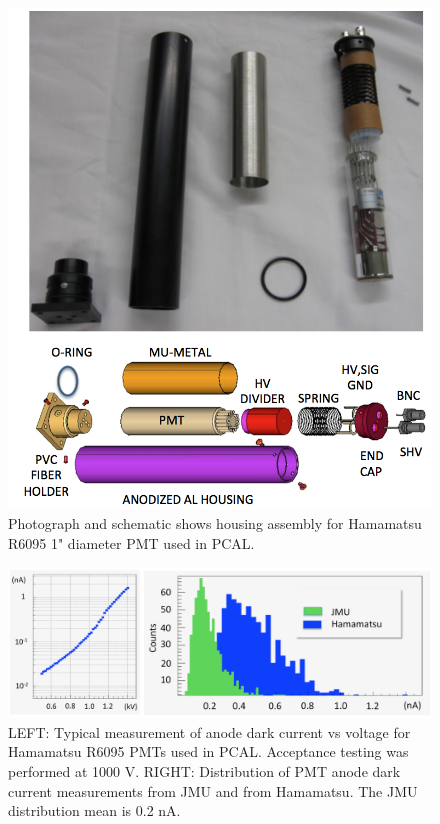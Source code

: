 \begin{figure}[hbt]
\centering
\includegraphics[width=0.85\columnwidth,keepaspectratio]{img/S4_PMT.png}
\caption{Photograph and schematic shows housing assembly for Hamamatsu R6095 1" diameter PMT used in PCAL.}
\label{fig:S4_PMT}
\end{figure}

\begin{figure}[hbt]
\centering
\includegraphics[width=1.0\columnwidth,keepaspectratio]{img/S4_PMT_2.png}
\caption{LEFT: Typical measurement of anode dark current vs voltage for Hamamatsu R6095 PMTs used in PCAL. Acceptance testing was performed at 1000 V.  RIGHT: Distribution of PMT anode dark current measurements from JMU and from Hamamatsu.  The JMU distribution mean is 0.2 nA.}
\label{fig:S4_PMT_2}
\end{figure}

